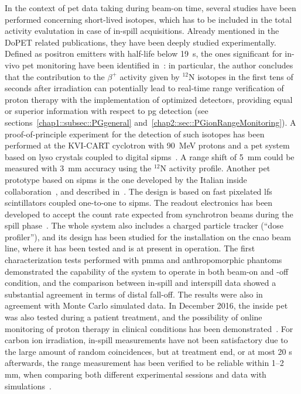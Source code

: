 In the context of \gls{pet} data taking during beam-on time, several studies have been performed concerning short-lived isotopes, which has to be included in the total activity evalutation in case of in-spill acquisitions. Already mentioned in the DoPET related publications, they have been deeply studied experimentally. Defined as positron emitters with half-life below 19~s, the ones significant for in-vivo \gls{pet} monitoring have been identified in~\cite{Dendooven2015}: in particular, the author concludes that the contribution to the $\beta^+$ activity given by $^{12}$N isotopes in the first tens of seconds after irradiation can potentially lead to real-time range verification of proton therapy with the implementation of optimized detectors, providing equal or superior information with respect to \gls{pg} detection (see sections~\ref{chap1::subsec::PGgeneral} and~\ref{chap2::sec::PGionRangeMonitoring}). A proof-of-principle experiment for the detection of such isotopes has been performed at the KVI-CART cyclotron with 90~MeV protons and a \gls{pet} system based on \gls{lyso} crystals coupled to  digital \glspl{sipm}~\parencite{Buitenhuis2017}.  A range shift of 5~mm could be measured with 3~mm accuracy using the $^{12}$N activity profile. 
Another \gls{pet} prototype based on \glspl{sipm} is the one developed by the Italian \gls{inside} collaboration~\parencite{Marafini2015}, and described in~\parencite{Bisogni2017}. The design is based on fast pixelated \gls{lfs} scintillators coupled one-to-one to \glspl{sipm}. The readout electronics has been developed to accept the count rate expected from synchrotron beams during the spill phase~\parencite{Rolo2013}. The whole system also includes a charged particle tracker (\enquote{dose profiler}), and its design has been studied for the installation on the \gls{cnao} beam line, where it has been tested and is at present in operation. The first characterization tests performed with \gls{pmma} and anthropomorphic phantoms demonstrated the capability of the system to operate in both beam-on and -off condition, and the comparison between in-spill and interspill data showed a substantial agreement in terms of distal fall-off. The results were also in agreement with Monte Carlo simulated data. In December 2016, the \gls{inside} \gls{pet} was also tested during a patient treatment, and the possibility of online monitoring of proton therapy in clinical conditions has been demonstrated~\parencite{Ferrero2018}. For carbon ion irradiation, in-spill measurements have not been satisfactory due to the large amount of random coincidences, but at treatment end, or at most 20 s afterwards, the range measurement has been verified to be reliable within 1–2 mm, when comparing both different experimental sessions and data with simulations~\parencite{Pennazio2018}. 
